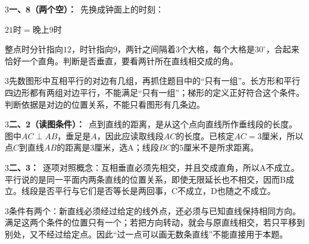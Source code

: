 \documentclass[multi=snippet,border={5bp 20bp 5bp 5bp}]{standalone}
\newenvironment{snippet}[3]{\begin{minipage}{#1bp}\color{answerred}\fontsize{#2}{#3}\selectfont\raggedright}{\end{minipage}}
\begin{document}
\begin{snippet}{505}{11.5}{14}\begin{multicols}{3}\raggedcolumns \textbf{一、8（两个空）：}\ 先换成钟面上的时刻：\par\noindent\(\displaystyle 21\text{时}=\text{晚上}9\text{时}\)\allowbreak \par 整点时分针指向\(12\)\allowbreak ，时针指向\(9\)\allowbreak ，两针之间隔着\(3\)\allowbreak 个大格，每个大格是\(30^\circ\)\allowbreak ，合起来恰好一个直角。判断是否垂直，要看两针所在直线相交成的角。\end{multicols}\end{snippet}
\begin{snippet}{505}{11.5}{14}\begin{multicols}{3}\raggedcolumns 先数图形中互相平行的对边有几组，再抓住题目中的“只有一组”。长方形和平行四边形都有两组对边平行，不能满足“只有一组”；梯形的定义正好符合这个条件。判断依据是对边的位置关系，不能只看图形有几条边。\end{multicols}\end{snippet}
\begin{snippet}{505}{11.5}{14}\begin{multicols}{3}\raggedcolumns \textbf{二、2（读图条件）：}\ 点到直线的距离，是从这个点向直线所作垂线段的长度。图中\(AC\perp AB\)\allowbreak ，垂足是\(A\)\allowbreak ，因此应读取线段\(AC\)\allowbreak 的长度。已核定\(AC=3\)\allowbreak 厘米，所以点\(C\)\allowbreak 到直线\(AB\)\allowbreak 的距离是\(3\)\allowbreak 厘米，选\(\mathrm A\)\allowbreak ；线段\(BC\)\allowbreak 的\(5\)\allowbreak 厘米不是所求距离。\end{multicols}\end{snippet}
\begin{snippet}{505}{11.5}{14}\begin{multicols}{3}\raggedcolumns \textbf{二、3：}\ 逐项对照概念：互相垂直必须先相交，并且交成直角，所以A不成立。平行说的是同一平面内两条直线的位置关系，即使无限延长也不相交，因而B成立。线段是否平行与它们是否等长是两回事，C不成立，D也随之不成立。\end{multicols}\end{snippet}
\begin{snippet}{505}{11.5}{14}\begin{multicols}{3}\raggedcolumns 条件有两个：新直线必须经过给定的线外点，还必须与已知直线保持相同方向。满足这两个条件的位置只有一个；若把方向转动，就会与原直线相交，若只平移到别处，又不经过给定点。因此“过一点可以画无数条直线”不能直接用于本题。\end{multicols}\end{snippet}
\end{document}
